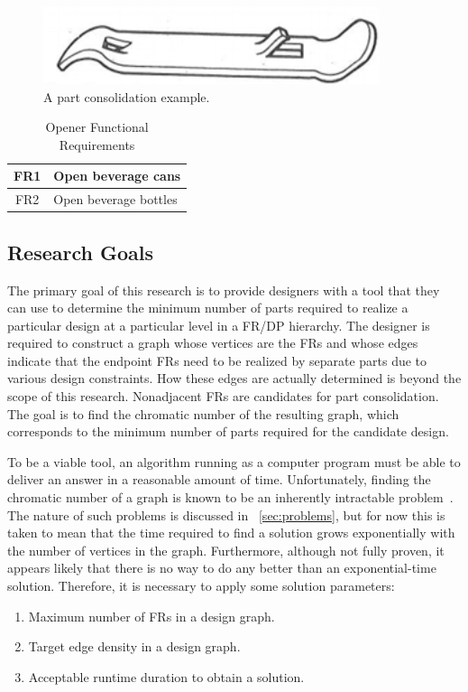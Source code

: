 \begin{figure}[H]
  \centering
  \includegraphics{opener}
  \caption{A part consolidation example.}
  \label{fig:opener}
\end{figure}

\begin{table}[H]
  \caption{Opener Functional Requirements}
  \label{tab:opener}
  \centering
  \begin{tabular}{|c|l|}
    \hline
    FR1 & Open beverage cans \\
    \hline
    FR2 & Open beverage bottles \\
    \hline
  \end{tabular}
\end{table}

\subsection{Research Goals}\label{sec:sub:goals}

The primary goal of this research is to provide designers with a tool that they can use to determine the minimum
number of parts required to realize a particular design at a particular level in a FR/DP hierarchy.  The designer
is required to construct a graph whose vertices are the FRs and whose edges indicate that the endpoint FRs need to
be realized by separate parts due to various design constraints.  How these edges are actually determined is beyond
the scope of this research.  Nonadjacent FRs are candidates for part consolidation.  The goal is to find the
chromatic number of the resulting graph, which corresponds to the minimum number of parts required for the
candidate design.

To be a viable tool, an algorithm running as a computer program must be able to deliver an answer in a reasonable
amount of time.  Unfortunately, finding the chromatic number of a graph is known to be an inherently intractable
problem~\cite{garey}.  The nature of such problems is discussed in \sectionname~\ref{sec:problems}, but for now
this is taken to mean that the time required to find a solution grows exponentially with the number of vertices in
the graph.  Furthermore, although not fully proven, it appears likely that there is no way to do any better than an
exponential-time solution.  Therefore, it is necessary to apply some solution parameters:
\begin{enumerate}
\item Maximum number of FRs in a design graph.
\item Target edge density in a design graph.
\item Acceptable runtime duration to obtain a solution.
\end{enumerate}

